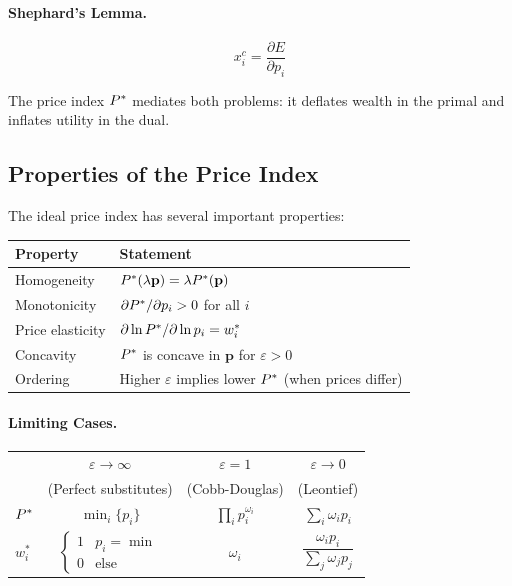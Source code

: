 \paragraph{Shephard's Lemma.}
\begin{equation}
x_i^c = \frac{\partial E}{\partial p_i}
\end{equation}

The price index $P^{*}$ mediates both problems: it deflates wealth in the primal and inflates utility in the dual.

\subsection{Properties of the Price Index}
\label{subsec:summary-properties}

The ideal price index has several important properties:

\begin{table}[H]
\centering
\renewcommand{\arraystretch}{1.4}
\begin{tabular}{@{}ll@{}}
\toprule
\textbf{Property} & \textbf{Statement} \\
\midrule
Homogeneity & $P^{*}(\lambda \mathbf{p}) = \lambda P^{*}(\mathbf{p})$ \\[2pt]
Monotonicity & $\partial P^{*} / \partial p_i > 0$ for all $i$ \\[2pt]
Price elasticity & $\partial \ln P^{*} / \partial \ln p_i = w_i^*$ \\[2pt]
Concavity & $P^{*}$ is concave in $\mathbf{p}$ for $\varepsilon > 0$ \\[2pt]
Ordering & Higher $\varepsilon$ implies lower $P^{*}$ (when prices differ) \\
\bottomrule
\end{tabular}
\end{table}

\paragraph{Limiting Cases.}
\begin{center}
\renewcommand{\arraystretch}{1.3}
\begin{tabular}{@{}lccc@{}}
\toprule
& $\varepsilon \to \infty$ & $\varepsilon = 1$ & $\varepsilon \to 0$ \\
& (Perfect substitutes) & (Cobb-Douglas) & (Leontief) \\
\midrule
$P^{*}$ & $\min_i \{p_i\}$ & $\prod_i p_i^{\omega_i}$ & $\sum_i \omega_i p_i$ \\[4pt]
$w_i^*$ & $\begin{cases} 1 & p_i = \min \\ 0 & \text{else} \end{cases}$ & $\omega_i$ & $\dfrac{\omega_i p_i}{\sum_j \omega_j p_j}$ \\
\bottomrule
\end{tabular}
\end{center}

